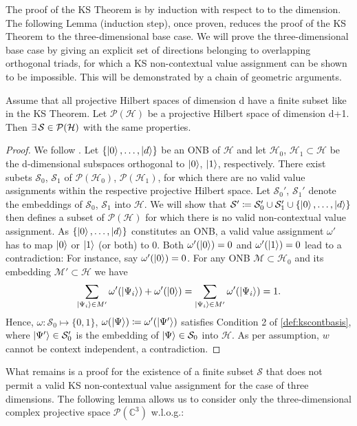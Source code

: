 The proof of the KS Theorem is by induction with respect to to the dimension. The following Lemma (induction step), once proven, reduces the proof of the KS Theorem to the three-dimensional base case. We will prove the three-dimensional base case by giving an explicit set of directions belonging to overlapping orthogonal triads, for which a KS non-contextual value assignment can be shown to be impossible. This will be demonstrated by a chain of geometric arguments.

\begin{lemma}\hfill\break
Assume that all projective Hilbert spaces of dimension d have a finite subset like in the KS Theorem. Let $\mathcal{P}(\mathcal{H})$ be a projective Hilbert space of dimension d+1. Then $\exists\thinspace\mathbb{\mathcal{S}\in\mathcal{P}}(\mathcal{H})$ with the same properties. 
\end{lemma}

\begin{proof}
We follow \cite{Pusey2019}. Let $\{\ket{0},\dots,\ket{d} \}$ be an ONB of $\mathcal{H}$ and let $\mathcal{H}_{0}$, $\mathcal{H}_{1}\subset\mathcal{H}$ be the d-dimensional subspaces orthogonal to $\ket{0}$, $\ket{1}$, respectively. There exist subets $\mathcal{S}_{0}$, $\mathcal{S}_{1}$ of $\mathcal{P}(\mathcal{H}_{0})$, $\mathcal{P}(\mathcal{H}_{1})$, for which there are no valid value assignments within the respective projective Hilbert space. Let $\mathcal{S}_{0}'$, $\mathcal{S}_{1}'$ denote the embeddings of $\mathcal{S}_{0}$, $\mathcal{S}_{1}$ into $\mathcal{H}$. We will show that $\mathcal{S}'\coloneqq\mathcal{S}_{0}'\cup\mathcal{S}_{1}'\cup\{\ket{0},\dots, \ket{d}\}$ then defines a subset of $\mathcal{P}(\mathcal{H})$ for which there is no valid non-contextual value assignment. As $\{\ket{0},\dots,\ket{d} \}$ constitutes an ONB, a valid value assignment $\omega'$ has to map $\ket{0}$ or $\ket{1}$  (or both) to 0. Both $\omega'(\ket{0})=0$ and $\omega'(\ket{1})=0$ lead to a contradiction: For instance, say $\omega'(\ket{0})=0$. For any ONB $\mathcal{M}\subset\mathcal{H}_{0}$ and its embedding $\mathcal{M'}\subset\mathcal{H}$ we have
\begin{equation*}
\sum\limits _{\ket{\Psi_{i}}\in M'}\omega'(\left|\Psi_{i}\right\rangle )+\omega'(\ket{0} )=\sum\limits _{\ket{\Psi_{i}}\in M'}\omega'(\ket{\Psi_{i}})=1.     
\end{equation*}
Hence, $\omega:\mathcal{S}_{0}\mapsto\{0,1\}$, $\omega(\ket{\Psi} )\coloneqq\omega'(\ket{\Psi'})$ satisfies Condition 2 of \ref{def:kscontbasis}, where $\ket{\Psi'} \in\mathcal{S}_{0}'$ is the embedding of $\ket{\Psi} \in\mathcal{S}_{0}$ into $\mathcal{H}$. As per assumption, $w$ cannot be context independent, a contradiction.
\end{proof}
What remains is a proof for the existence of a finite subset $\mathcal{S}$ that does not permit a valid KS non-contextual value assignment for the case of three dimensions. The following lemma allows us to consider only the three-dimensional complex projective space $\mathcal{P}(\mathbb{C}^{3})$ w.l.o.g.:


